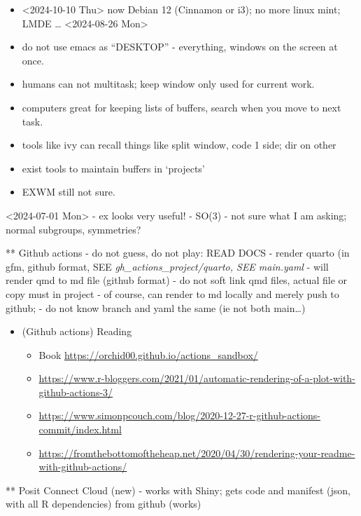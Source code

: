 \documentclass[
  letterpaper,
  DIV=11,
  numbers=noendperiod]{scrartcl}
\providecommand{\tightlist}{%
  \setlength{\itemsep}{0pt}\setlength{\parskip}{0pt}}\usepackage{longtable,booktabs,array}
\begin{document}
\begin{itemize}
\tightlist
\item
  \textless2024-10-10 Thu\textgreater{} now Debian 12 (Cinnamon or i3);
  no more linux mint; LMDE \ldots{} \textless2024-08-26
  Mon\textgreater{}
\item
  do not use emacs as ``DESKTOP'' - everything, windows on the screen at
  once.
\item
  humans can not multitask; keep window only used for current work.
\item
  computers great for keeping lists of buffers, search when you move to
  next task.
\item
  tools like ivy can recall things like split window, code 1 side; dir
  on other
\item
  exist tools to maintain buffers in `projects'
\item
  EXWM still not sure.
\end{itemize}

\textless2024-07-01 Mon\textgreater{} - ex looks very useful! - SO(3) -
not sure what I am asking; normal subgroups, symmetries?

** Github actions - do not guess, do not play: READ DOCS - render quarto
(in gfm, github format, SEE \emph{gh\_actions\_project/quarto, SEE
main.yaml} - will render qmd to md file (github format) - do not soft
link qmd files, actual file or copy must in project - of course, can
render to md locally and merely push to github; - do not know branch and
yaml the same (ie not both main\ldots)

\begin{itemize}
\tightlist
\item
  (Github actions) Reading

  \begin{itemize}
  \tightlist
  \item
    Book \url{https://orchid00.github.io/actions_sandbox/}
  \item
    \url{https://www.r-bloggers.com/2021/01/automatic-rendering-of-a-plot-with-github-actions-3/}
  \item
    \url{https://www.simonpcouch.com/blog/2020-12-27-r-github-actions-commit/index.html}
  \item
    \url{https://fromthebottomoftheheap.net/2020/04/30/rendering-your-readme-with-github-actions/}
  \end{itemize}
\end{itemize}

** Posit Connect Cloud (new) - works with Shiny; gets code and manifest
(json, with all R dependencies) from github (works)
\end{document}
